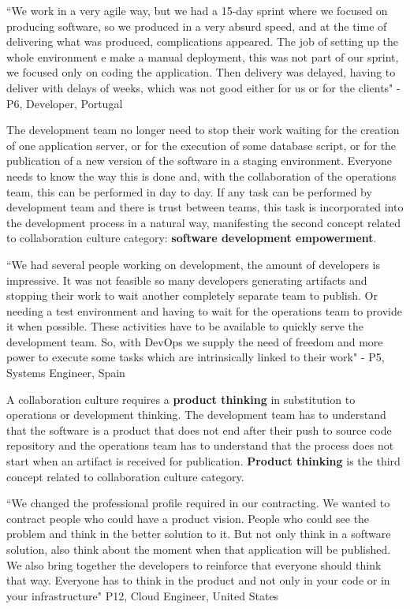 ``We work in a very agile way, but we had a 15-day sprint where we focused on
producing software, so we produced in a very absurd speed, and at the time of
delivering what was produced, complications appeared. The job of setting up
the whole environment e make a manual deployment, this was not part of our
sprint, we focused only on coding the application. Then delivery was delayed,
having to deliver with delays of weeks, which was not good either for us or for
the clients" - P6, Developer, Portugal

The development team no longer need to stop their work waiting for the creation
of one application server, or for the execution of some database script, or for
the publication of a new version of the software in a staging environment.
Everyone needs to know the way this is done and, with the collaboration of the
operations team, this can be performed in day to day. If any task can be
performed by development team and there is trust between teams, this task is
incorporated into the development process in a natural way, manifesting the
second concept related to collaboration culture category: \textbf{software
development empowerment}.

``We had several people working on development, the amount of developers is
impressive. It was not feasible so many developers generating artifacts and
stopping their work to wait another completely separate team to publish. Or
needing a test environment and having to wait for the operations team to
provide it when possible. These activities have to be available to quickly
serve the development team. So, with DevOps we supply the need of freedom and
more power to execute some tasks which are intrinsically linked to their work"
- P5, Systems Engineer, Spain

A collaboration culture requires a \textbf{product thinking} in substitution to
operations or development thinking. The development team has to understand that
the software is a product that does not end after their push to source code
repository and the operations team has to understand that the process does not
start when an artifact is received for publication. \textbf{Product thinking}
is the third concept related to collaboration culture category.

``We changed the professional profile required in our contracting. We wanted to
contract people who could have a product vision. People who could see the
problem and think in the better solution to it. But not only think in a
software solution, also think about the moment when that application will be
published. We also bring together the developers to reinforce that everyone
should think that way. Everyone has to think in the product and not only in
your code or in your infrastructure" P12, Cloud Engineer, United States

